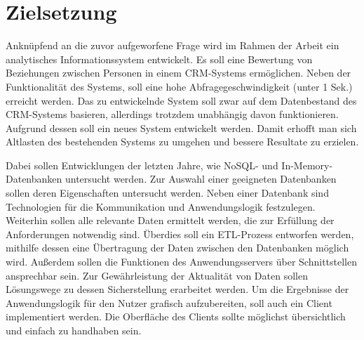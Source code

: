 
\section{Zielsetzung}
\label{ch:Einfuehrung:sec:Zielsetzung}

Anknüpfend an die zuvor aufgeworfene Frage wird im Rahmen der Arbeit ein analytisches Informationssystem entwickelt. Es soll eine Bewertung von Beziehungen zwischen Personen in einem CRM-Systems ermöglichen. Neben der Funktionalität des Systems, soll eine hohe Abfragegeschwindigkeit (unter 1 Sek.) erreicht werden. Das zu entwickelnde System soll zwar auf dem Datenbestand des CRM-Systems basieren, allerdings trotzdem unabhängig davon funktionieren. Aufgrund dessen soll ein neues System entwickelt werden. Damit erhofft man sich Altlasten des bestehenden Systems zu umgehen und bessere Resultate zu erzielen. 

Dabei sollen Entwicklungen der letzten Jahre, wie NoSQL- und In-Memory-Datenbanken  untersucht werden. Zur Auswahl einer geeigneten Datenbanken sollen deren Eigenschaften untersucht werden. Neben einer Datenbank sind Technologien für die Kommunikation und Anwendungslogik festzulegen. Weiterhin sollen alle relevante Daten ermittelt werden, die zur Erfüllung der Anforderungen notwendig sind. Überdies soll ein ETL-Prozess entworfen werden, mithilfe dessen eine Übertragung der Daten zwischen den Datenbanken möglich wird. Außerdem sollen die Funktionen des Anwendungsservers über Schnittstellen ansprechbar sein. Zur Gewährleistung der Aktualität von Daten sollen Lösungswege zu dessen Sicherstellung erarbeitet werden. Um die Ergebnisse der Anwendungslogik für den Nutzer grafisch aufzubereiten, soll auch ein Client implementiert werden. Die Oberfläche des Clients sollte möglichst übersichtlich und einfach zu handhaben sein.

